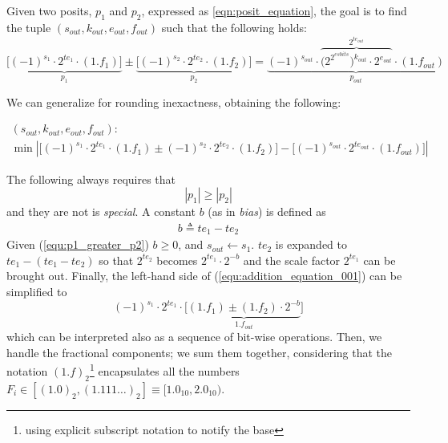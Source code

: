 Given two posits, $p_1$ and $p_2$, expressed as \eqref{eqn:posit_equation}, the goal is to find the tuple $(s_{out}, k_{out}, e_{out}, f_{out})$ such that the following holds:
\begin{equation}\label{equ:addition_equation_001}
    \underbrace{\big[ (-1)^{s_1} \cdot 2^{te_1} \cdot (1.f_1) \big]}_{p_1} \pm \underbrace{\big[ (-1)^{s_2} \cdot 2^{te_2} \cdot (1.f_2) \big]}_{p_2} = \underbrace{ (-1)^{s_{out}} \cdot \overbrace{\big(2^{2^{esbits}}\big)^{k_{out}} \cdot 2^{e_{out}}}^{2^{te_{out}}} \cdot (1.f_{out})}_{p_{out}}
\end{equation}

We can generalize for rounding inexactness, obtaining the following:

\begin{equation}
\begin{gathered}
    (s_{out}, k_{out}, e_{out}, f_{out}): \\
    \min | \big[ (-1)^{s_1} \cdot 2^{te_1} \cdot (1.f_1) \pm (-1)^{s_2} \cdot 2^{te_2} \cdot (1.f_2) \big] - \big[ (-1)^{s_{out}} \cdot 2^{te_{out}} \cdot (1.f_{out}) \big] |
\end{gathered}
\end{equation}


The following always requires that
\begin{equation}\label{equ:p1_greater_p2}
|p_1| \ge |p_2|
\end{equation}
and they are not  is \textit{special}.
A constant $b$ (as in \textit{bias}) is defined as
\begin{equation}\label{equ:b_bias}
\begin{aligned}
b \triangleq te_1 - te_2
\end{aligned}
\end{equation}
Given (\ref{equ:p1_greater_p2}) $b \ge 0$, and $s_{out} \leftarrow s_1$. $te_2$ is expanded to $te_1 - (te_1 - te_2)$ so that $2^{te_2}$ becomes $2^{te_1} \cdot 2^{-b}$ and the scale factor $2^{te_1}$ can be brought out. Finally, the left-hand side of (\ref{equ:addition_equation_001}) can be simplified to
\begin{equation}
(-1)^{s_1} \cdot 2^{te_1} \cdot \big[ \underbrace{(1.f_1) \pm (1.f_2) \cdot 2^{-b}}_{1.f_{out}}\big]
\end{equation}
which can be interpreted also as a sequence of bit-wise operations.
Then, we handle the fractional components; we sum them together, considering that the notation $(1.f)_2$\footnote{using explicit subscript notation to notify the base} encapsulates all the numbers $F_i \in [(1.0)_2, (1.111\dots)_2 ] \equiv [1.0_{10},  2.0_{10})$.

